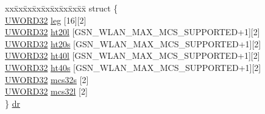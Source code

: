 \begin{DoxyCompactItemize}
\begin{tabbing}
\end{tabbing}\item 
\begin{tabbing}
xx\=xx\=xx\=xx\=xx\=xx\=xx\=xx\=xx\=\kill
struct \{\\
\>\hyperlink{a00677_gad0599cef3ddc489e9b2fe8afc3159f12}{UWORD32} \hyperlink{a00410_aaf690b30c7bb3b5f1b5675f84c7c92e5}{leg} \mbox{[}16\mbox{]}\mbox{[}2\mbox{]}\\
\>\hyperlink{a00677_gad0599cef3ddc489e9b2fe8afc3159f12}{UWORD32} \hyperlink{a00410_a5512e7cbb968332fffc963132021c2a9}{ht20l} \mbox{[}GSN\_WLAN\_MAX\_MCS\_SUPPORTED+1\mbox{]}\mbox{[}2\mbox{]}\\
\>\hyperlink{a00677_gad0599cef3ddc489e9b2fe8afc3159f12}{UWORD32} \hyperlink{a00410_ac3156ecb8d65f7e4aac2caf45fff0d1a}{ht20s} \mbox{[}GSN\_WLAN\_MAX\_MCS\_SUPPORTED+1\mbox{]}\mbox{[}2\mbox{]}\\
\>\hyperlink{a00677_gad0599cef3ddc489e9b2fe8afc3159f12}{UWORD32} \hyperlink{a00410_ab42c2405c4fac47ff38d981b9ebcb346}{ht40l} \mbox{[}GSN\_WLAN\_MAX\_MCS\_SUPPORTED+1\mbox{]}\mbox{[}2\mbox{]}\\
\>\hyperlink{a00677_gad0599cef3ddc489e9b2fe8afc3159f12}{UWORD32} \hyperlink{a00410_abb9b5107f666672351985f8fc94b7f54}{ht40s} \mbox{[}GSN\_WLAN\_MAX\_MCS\_SUPPORTED+1\mbox{]}\mbox{[}2\mbox{]}\\
\>\hyperlink{a00677_gad0599cef3ddc489e9b2fe8afc3159f12}{UWORD32} \hyperlink{a00410_af6ac2ed83df90516d588a62afe6df20f}{mcs32s} \mbox{[}2\mbox{]}\\
\>\hyperlink{a00677_gad0599cef3ddc489e9b2fe8afc3159f12}{UWORD32} \hyperlink{a00410_a6d5ba148df5237ec93937479cad72cd9}{mcs32l} \mbox{[}2\mbox{]}\\
\} \hyperlink{a00410_a01138127fe90db703f2c45ded1bed4aa}{dr}\\


\end{tabbing}
\end{DoxyCompactItemize}
